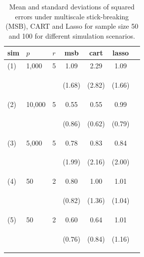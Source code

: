 \documentclass{article}
\begin{document}
\begin{table}[t]
\caption{Mean and standard deviations of squared errors under multiscale stick-breaking (MSB), CART and Lasso for sample size 50 and 100 for different simulation scenarios.}\label{table1}
\vskip 0.15in
\begin{center}
\begin{small}
\begin{sc}
\begin{tabular}{lllcccc}
\hline
\abovespace\belowspace
 sim&$p$&$r$& msb&cart&lasso\\
\hline
\abovespace
\belowspace
(1)  & 1,000 &5& 1.09&2.29& 1.09 \\
&& & \begin{scriptsize} (1.68)\end{scriptsize} & \begin{scriptsize} (2.82)\end{scriptsize}& \begin{scriptsize} (1.66)\end{scriptsize}\\
(2)&10,000& 5&0.55& 0.55 &0.99\\ 
&&& \begin{scriptsize} (0.86)\end{scriptsize} & \begin{scriptsize} (0.62)\end{scriptsize} & \begin{scriptsize} (0.79)\end{scriptsize}\\
(3)&5,000 &5&  0.78 &0.83 & 0.84\\
&&&   \begin{scriptsize} (1.99)\end{scriptsize} & \begin{scriptsize} (2.16)\end{scriptsize} & \begin{scriptsize} (2.00)\end{scriptsize}\\
(4)&50&2& 0.80&1.00&1.01 \\
&&& \begin{scriptsize} (0.82)\end{scriptsize}& \begin{scriptsize} (1.36)\end{scriptsize}& \begin{scriptsize} (1.04)\end{scriptsize}\\
(5) &50&2 & 0.60&0.64 &1.01\\  
&&& \begin{scriptsize} (0.76)\end{scriptsize}& \begin{scriptsize} (0.84)\end{scriptsize}& \begin{scriptsize} (1.16)\end{scriptsize}\\
\hline
\end{tabular}
\end{sc}
\end{small}
\end{center}
\vskip -0.1in
\end{table}
\end{document}
